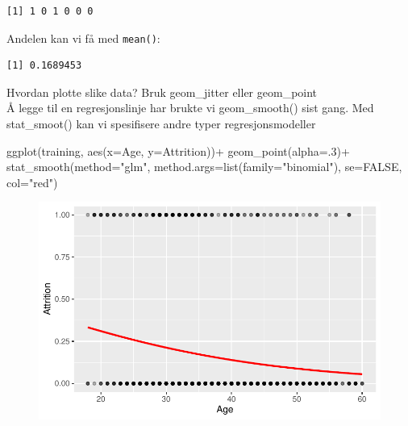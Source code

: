 \documentclass[
  letterpaper,
  DIV=11,
  numbers=noendperiod]{scrreprt}
\newenvironment{Shaded}{\begin{snugshade}}{\end{snugshade}}
\newcommand{\AttributeTok}[1]{\textcolor[rgb]{0.40,0.45,0.13}{#1}}
\newcommand{\ConstantTok}[1]{\textcolor[rgb]{0.56,0.35,0.01}{#1}}
\newcommand{\DecValTok}[1]{\textcolor[rgb]{0.68,0.00,0.00}{#1}}
\newcommand{\FunctionTok}[1]{\textcolor[rgb]{0.28,0.35,0.67}{#1}}
\newcommand{\NormalTok}[1]{\textcolor[rgb]{0.00,0.23,0.31}{#1}}
\newcommand{\SpecialCharTok}[1]{\textcolor[rgb]{0.37,0.37,0.37}{#1}}
\newcommand{\StringTok}[1]{\textcolor[rgb]{0.13,0.47,0.30}{#1}}
\theoremstyle{definition}
\theoremstyle{remark}
\begin{document}
\begin{verbatim}
[1] 1 0 1 0 0 0
\end{verbatim}

Andelen kan vi få med \texttt{mean()}:

\begin{Shaded}
\end{Shaded}

\begin{verbatim}
[1] 0.1689453
\end{verbatim}

Hvordan plotte slike data? Bruk geom\_jitter eller geom\_point\\
Å legge til en regresjonslinje har brukte vi geom\_smooth() sist gang.
Med stat\_smoot() kan vi spesifisere andre typer regresjonsmodeller

\begin{Shaded}
\begin{Highlighting}[]
\FunctionTok{ggplot}\NormalTok{(training, }\FunctionTok{aes}\NormalTok{(}\AttributeTok{x=}\NormalTok{Age, }\AttributeTok{y=}\NormalTok{Attrition))}\SpecialCharTok{+} 
  \FunctionTok{geom\_point}\NormalTok{(}\AttributeTok{alpha=}\NormalTok{.}\DecValTok{3}\NormalTok{)}\SpecialCharTok{+} 
  \FunctionTok{stat\_smooth}\NormalTok{(}\AttributeTok{method=}\StringTok{"glm"}\NormalTok{, }\AttributeTok{method.args=}\FunctionTok{list}\NormalTok{(}\AttributeTok{family=}\StringTok{"binomial"}\NormalTok{), }\AttributeTok{se=}\ConstantTok{FALSE}\NormalTok{, }\AttributeTok{col=}\StringTok{"red"}\NormalTok{) }
\end{Highlighting}
\end{Shaded}

\begin{figure}[H]

{\centering \includegraphics{./logistisk_regresjon_files/figure-pdf/unnamed-chunk-9-1.pdf}

}

\end{figure}
\end{document}

